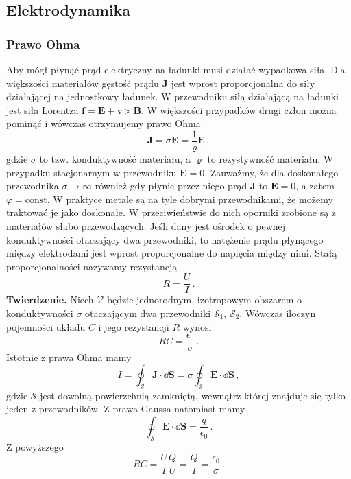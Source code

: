 \documentclass[../main.tex]{subfiles}
\begin{document}
\subsection{Elektrodynamika}
\subsubsection{Prawo Ohma}
Aby mógł płynąć prąd elektryczny na ładunki musi działać wypadkowa siła. Dla większości materiałów gęstość prądu \(\mathbf{J}\) jest wprost proporcjonalna do siły działającej na jednostkowy ładunek. W przewodniku siłą działającą na ładunki jest siła Lorentza \(\mathbf{f}=\mathbf{E}+\mathbf{v}\times\mathbf{B}\). W większości przypadków drugi człon można pominąć i wówczas otrzymujemy prawo Ohma
\begin{equation*}
    \mathbf{J}=\sigma\mathbf{E}=\frac{1}{\varrho}\mathbf{E}\,,
\end{equation*}
gdzie \(\sigma\) to tzw. konduktywność materiału, a \(\varrho\) to rezystywność materiału. W przypadku stacjonarnym w przewodniku \(\mathbf{E}=0\). Zauważmy, że dla doskonałego przewodnika \(\sigma\to\infty\) również gdy płynie przez niego prąd \(\mathbf{J}\) to \(\mathbf{E}=0\), a zatem \(\varphi=\text{const}\). W praktyce metale są na tyle dobrymi przewodnikami, że możemy traktować je jako doskonałe. W przeciwieństwie do nich oporniki zrobione są z materiałów słabo przewodzących. Jeśli dany jest ośrodek o pewnej konduktywności otaczający dwa przewodniki, to natężenie prądu płynącego między elektrodami jest wprost proporcjonalne do napięcia między nimi. Stałą proporcjonalności nazywamy rezystancją
\begin{equation*}
    R=\frac{U}{I}\,.
\end{equation*}
\textbf{Twierdzenie.} Niech \(\mathcal{V}\) będzie jednorodnym, izotropowym obszarem o konduktywności \(\sigma\) otaczającym dwa przewodniki \(\mathcal{S}_1\), \(\mathcal{S}_2\). Wówczas iloczyn pojemności układu \(C\) i jego rezystancji \(R\) wynosi
\begin{equation*}
    RC=\frac{\epsilon_0}{\sigma}\,.
\end{equation*}
Istotnie z prawa Ohma mamy
\begin{equation*}
    I=\oint_\mathcal{S}\mathbf{J}\cdot\dd{\mathbf{S}}=\sigma\oint_\mathcal{S}\mathbf{E}\cdot\dd{\mathbf{S}}\,,
\end{equation*}
gdzie \(\mathcal{S}\) jest dowolną powierzchnią zamkniętą, wewnątrz której znajduje się tylko jeden z przewodników. Z prawa Gaussa natomiast mamy
\begin{equation*}
    \oint_\mathcal{S}\mathbf{E}\cdot\dd{\mathbf{S}}=\frac{q}{\epsilon_0}\,.
\end{equation*}
Z powyższego
\begin{equation*}
    RC=\frac{U}{I}\frac{Q}{U}=\frac{Q}{I}=\frac{\epsilon_0}{\sigma}\,.
\end{equation*}
\end{document}
